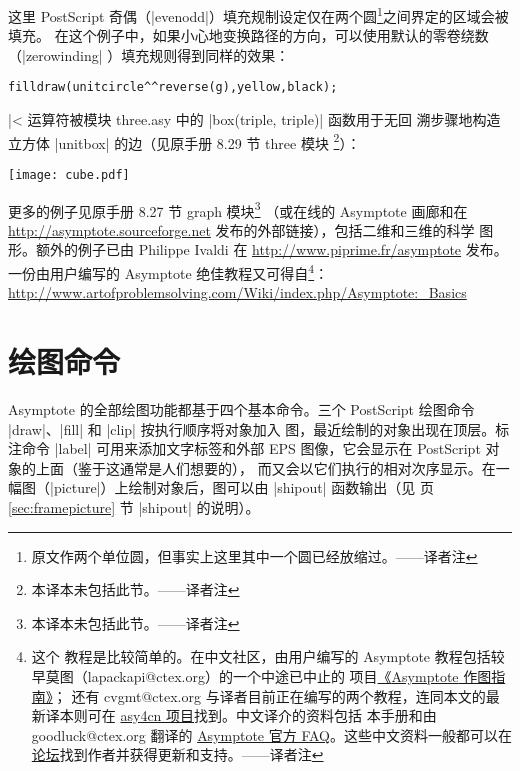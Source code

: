 \documentclass[nofonts,CJKnormalspaces]{ctexbook}[2009/05/20]
\newcommand*\prgname[1]{\textsf{#1}}
\newcommand\transnote[1]{\footnote{#1——译者注}}
\begin{document}
这里 \prgname{PostScript} 奇偶（|evenodd|）填充规制设定仅在两个圆\transnote{%
原文作两个单位圆，但事实上这里其中一个圆已经放缩过。}之间界定的区域会被填充。
在这个例子中，如果小心地变换路径的方向，可以使用默认的零卷绕数（|zerowinding|
）填充规则得到同样的效果：
\begin{lstlisting}
filldraw(unitcircle^^reverse(g),yellow,black);
\end{lstlisting}

|^^| 运算符被模块 \prgname{three.asy} 中的 |box(triple, triple)| 函数用于无回
溯步骤地构造立方体 |unitbox| 的边（见原手册 8.29 节 \prgname{three} 模块
\transnote{本译本未包括此节。}）：

\begin{center}
  \texttt{[image: cube.pdf]}
\end{center}

更多的例子见原手册 8.27 节 \prgname{graph} 模块\transnote{本译本未包括此节。}
（或在线的 \prgname{Asymptote} 画廊和在
\url{http://asymptote.sourceforge.net} 发布的外部链接），包括二维和三维的科学
图形。额外的例子已由 Philippe Ivaldi 在
\url{http://www.piprime.fr/asymptote} 发布。
一份由用户编写的 \prgname{Asymptote} 绝佳教程又可得自\transnote{这个
教程是比较简单的。在中文社区，由用户编写的
\prgname{Asymptote} 教程包括较早莫图（lapackapi@ctex.org）的一个中途已中止的
项目\href{http://gzmfig.googlepages.com/}{《\prgname{Asymptote} 作图指南》}；
还有 cvgmt@ctex.org 与译者目前正在编写的两个教程，连同本文的最新译本则可在
\href{http://code.google.com/p/asy4cn/}{asy4cn 项目}找到。中文译介的资料包括
本手册和由 goodluck@ctex.org 翻译的
\href{http://bbs.ctex.org/viewthread.php?tid=47344}
{\prgname{Asymptote} 官方 FAQ}。这些中文资料一般都可以在
\href{http://bbs.ctex.org}{\CTeX{} 论坛}找到作者并获得更新和支持。}：
\url{http://www.artofproblemsolving.com/Wiki/index.php/Asymptote:_Basics}



\chapter{绘图命令}
\label{chap:drawingcommands}

\prgname{Asymptote} 的全部绘图功能都基于四个基本命令。三个
\prgname{PostScript} 绘图命令 |draw|、|fill| 和 |clip| 按执行顺序将对象加入
图，最近绘制的对象出现在顶层。标注命令 |label| 可用来添加文字标签和外部 EPS
图像，它会显示在 \prgname{PostScript} 对象的上面（鉴于这通常是人们想要的），
而又会以它们执行的相对次序显示。在一幅图（|picture|）上绘制对象后，图可以由
|shipout| 函数输出（见 \pageref{sec:framepicture} 页
\ref{sec:framepicture} 节 |shipout| 的说明）。
\end{document}
